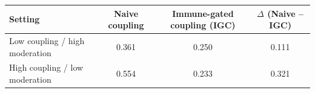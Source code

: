 \begin{tabular}{lccc}
\toprule
Setting & Naive coupling & Immune-gated coupling (IGC) & $\Delta$ (Naive -- IGC) \\
\midrule
Low coupling / high moderation & 0.361 & 0.250 & 0.111 \\
High coupling / low moderation & 0.554 & 0.233 & 0.321 \\
\bottomrule
\end{tabular}
